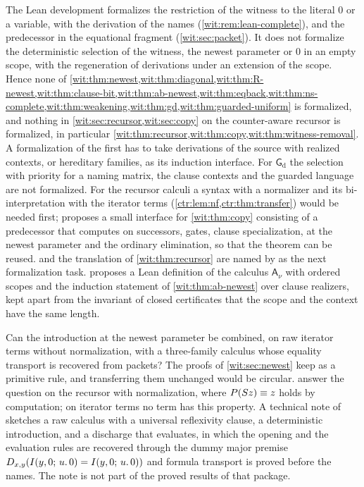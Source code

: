 \begin{question}
\label{wit:q:lean-newest}
The Lean development formalizes the restriction of the witness to the
literal $0$ or a variable, with the derivation of the names
(\cref{wit:rem:lean-complete}), and the predecessor in the equational
fragment (\cref{wit:sec:packet}).  It does not formalize the deterministic
selection of the witness, the newest parameter or $0$ in an empty scope,
with the regeneration of derivations under an extension of the scope.
Hence none of
\cref{wit:thm:newest,wit:thm:diagonal,wit:thm:R-newest,wit:thm:clause-bit,wit:thm:ab-newest,wit:thm:eqback,wit:thm:ns-complete,wit:thm:weakening,wit:thm:gd,wit:thm:guarded-uniform}
is formalized, and nothing in \cref{wit:sec:recursor,wit:sec:copy} on the
counter-aware recursor is formalized, in particular
\cref{wit:thm:recursor,wit:thm:copy,wit:thm:witness-removal}.  A
formalization of the first has to take derivations of the source with
realized contexts, or hereditary families, as its induction interface.  For
$\mathsf{G}_{\mathrm d}$ the selection with priority for a naming matrix,
the clause contexts and the guarded language are not formalized.  For the
recursor calculi a syntax with a normalizer and its bi-interpretation with
the iterator terms (\cref{ctr:lem:nf,ctr:thm:transfer}) would be needed
first;
 proposes a small interface for
\cref{wit:thm:copy} consisting of a predecessor that computes on
successors, gates, clause specialization,  at the newest
parameter and the ordinary elimination, so that the theorem can be reused.
 and the translation of \cref{wit:thm:recursor} are
named by  as the next formalization task.
 proposes a Lean definition of the calculus
$\mathsf{A}_{\nu}$ with ordered scopes and the induction statement of
\cref{wit:thm:ab-newest} over clause realizers, kept apart from the
invariant of closed certificates that the scope and the context have the
same length.
\end{question}

\begin{question}
\label{wit:q:raw-three}
Can the introduction at the newest parameter be combined, on raw iterator
terms without normalization, with a three-family calculus whose equality
transport is recovered from packets?  The proofs of \cref{wit:sec:newest}
keep  as a primitive rule, and transferring them unchanged
would be circular.   answer the
question on the recursor with normalization, where $P(S z)\equiv z$
holds by computation; on iterator terms no term has this property.  A
technical note of  sketches a raw calculus with a
universal reflexivity clause, a deterministic introduction, 
and a discharge that evaluates, in which the opening and the evaluation
rules are recovered through the dummy major premise
$D_{x,y}(I(y,0;\,u.\,0)=I(y,0;\,u.\,0))$ and formula transport is proved
before the names.  The note is not part of the proved results of that
package.
\end{question}

